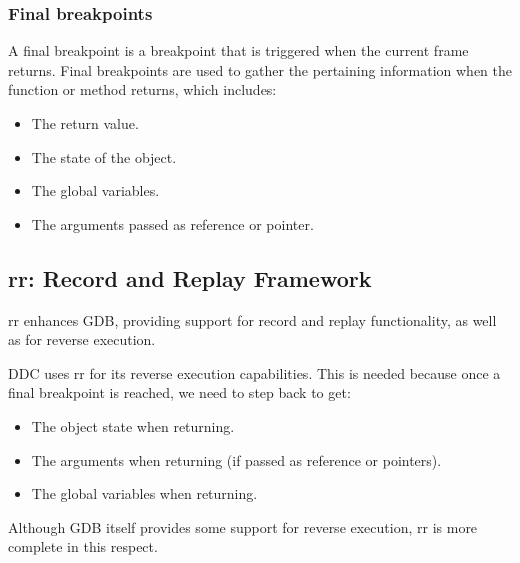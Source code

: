 \subsubsection{Final breakpoints}
A final breakpoint is a breakpoint that is triggered when the current frame returns. Final breakpoints are used to gather the pertaining information when the function or method returns, which includes:
\begin{itemize}
    \item The return value.
    \item The state of the object.
    \item The global variables.
    \item The arguments passed as reference or pointer.
\end{itemize}

\subsection{rr: Record and Replay Framework}

rr enhances GDB, providing support for record and replay functionality, as well as for reverse execution.

DDC uses rr for its reverse execution capabilities. This is needed because once a final breakpoint is reached, we need to step back to get:
\begin{itemize}
    \item The object state when returning.
    \item The arguments when returning (if passed as reference or pointers).
    \item The global variables when returning.
\end{itemize}
Although GDB itself provides some support for reverse execution, rr is more complete in this respect.

